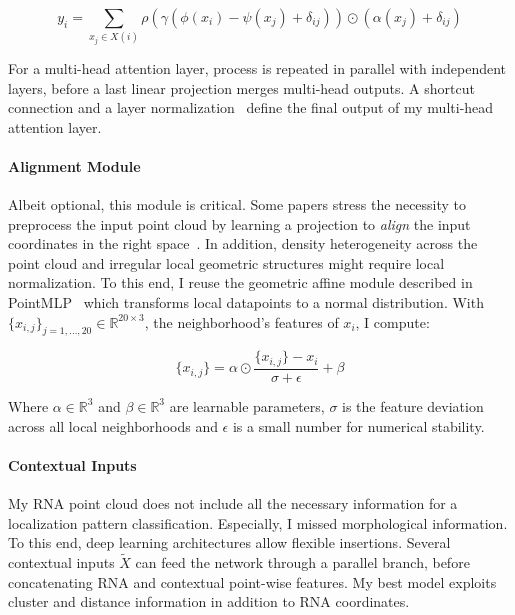 \begin{equation}
	{\displaystyle y_i = \sum_{x_j \in X(i)} \rho(\gamma(\phi(x_i) - \psi(x_j) + \delta_{ij})) \odot (\alpha(x_j) + \delta_{ij})}
\end{equation}

For a multi-head attention layer, process is repeated in parallel with independent layers, before a last linear projection merges multi-head outputs.
A shortcut connection and a layer normalization~\cite{ba2016layer} define the final output of my multi-head attention layer.

\paragraph{Alignment Module}

Albeit optional, this module is critical.
Some papers stress the necessity to preprocess the input point cloud by learning a projection to \emph{align} the input coordinates in the right space~\cite{Qi_2017_CVPR,Wang_2019}.
In addition, density heterogeneity across the point cloud and irregular local geometric structures might require local normalization.
To this end, I reuse the geometric affine module described in PointMLP~\cite{ma2022rethinking} which transforms local datapoints to a normal distribution.
With $\{x_{i, j}\}_{j=1,\dots,20} \in \mathbb{R}^{20 \times 3}$, the neighborhood's features of $x_i$, I compute:

\begin{equation}
	{\displaystyle \{x_{i, j}\} = \alpha \odot \frac{\{x_{i, j}\} - x_i}{\sigma + \epsilon} + \beta}
\end{equation}

\noindent
Where $\alpha \in \mathbb{R}^3$ and $\beta \in \mathbb{R}^3$ are learnable parameters, $\sigma$ is the feature deviation across all local neighborhoods and $\epsilon$ is a small number for numerical stability.

\paragraph{Contextual Inputs}

My \ac{RNA} point cloud does not include all the necessary information for a localization pattern classification.
Especially, I missed morphological information.
To this end, deep learning architectures allow flexible insertions.
Several contextual inputs $\tilde{X}$ can feed the network through a parallel branch, before concatenating \ac{RNA} and contextual point-wise features.
My best model exploits cluster and distance information in addition to \ac{RNA} coordinates.

